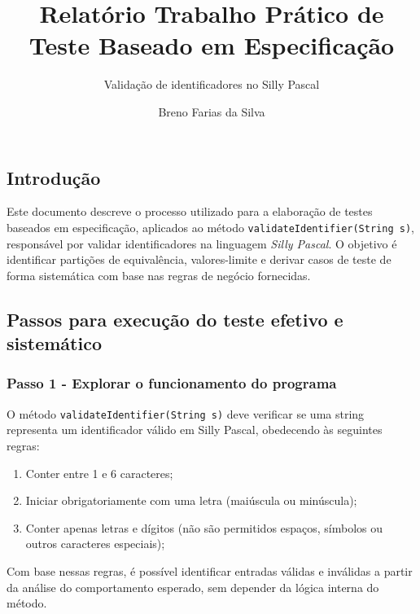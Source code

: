 \documentclass[
  letterpaper,
  DIV=11,
  numbers=noendperiod]{scrartcl}
\title{Relatório Trabalho Prático de Teste Baseado em Especificação}
\subtitle{Validação de identificadores no Silly Pascal}
\author{Breno Farias da Silva}
\date{}
\providecommand{\tightlist}{%
  \setlength{\itemsep}{0pt}\setlength{\parskip}{0pt}}
\renewcommand*\contentsname{Table of contents}
\newcommand\contentsname{Table of contents}
\begin{document}
\maketitle

\renewcommand*\contentsname{Sumário}
{
\hypersetup{linkcolor=}
\setcounter{tocdepth}{3}
\tableofcontents
}

\subsection{Introdução}\label{introduuxe7uxe3o}

Este documento descreve o processo utilizado para a elaboração de testes
baseados em especificação, aplicados ao método
\texttt{validateIdentifier(String\ s)}, responsável por validar
identificadores na linguagem \emph{Silly Pascal}. O objetivo é
identificar partições de equivalência, valores-limite e derivar casos de
teste de forma sistemática com base nas regras de negócio fornecidas.

\subsection{Passos para execução do teste efetivo e
sistemático}\label{passos-para-execuuxe7uxe3o-do-teste-efetivo-e-sistemuxe1tico}

\subsubsection{Passo 1 - Explorar o funcionamento do
programa}\label{passo-1---explorar-o-funcionamento-do-programa}

O método \texttt{validateIdentifier(String\ s)} deve verificar se uma
string representa um identificador válido em Silly Pascal, obedecendo às
seguintes regras:

\begin{enumerate}
\def\labelenumi{\arabic{enumi}.}
\tightlist
\item
  Conter entre 1 e 6 caracteres;
\item
  Iniciar obrigatoriamente com uma letra (maiúscula ou minúscula);
\item
  Conter apenas letras e dígitos (não são permitidos espaços, símbolos
  ou outros caracteres especiais);
\end{enumerate}

Com base nessas regras, é possível identificar entradas válidas e
inválidas a partir da análise do comportamento esperado, sem depender da
lógica interna do método.
\end{document}
